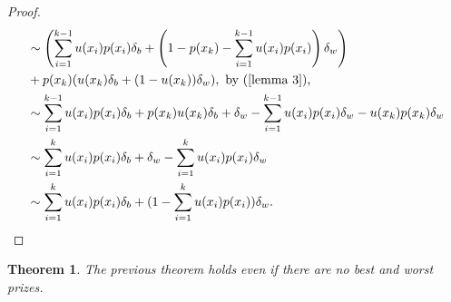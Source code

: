 \documentclass[12pt]{article}
\newtheorem{thm}{Theorem}[section]
\theoremstyle{definition}
\theoremstyle{remark}
\begin{document}
\begin{proof}
\begin{align*}
    &\sim \left(\sum_{i = 1}^{k - 1}u(x_i)p(x_i)\delta_b + \left(1 - p(x_k) - \sum_{i = 1}^{k - 1}u(x_i)p(x_i)\right)\delta_w\right) \\ &+  p(x_k)(u(x_k)\delta_b + (1 - u(x_k))\delta_w), \text{ by (\ref{lemma 3}),} \\
    &\sim \sum_{i = 1}^{k - 1}u(x_i)p(x_i)\delta_b + p(x_k)u(x_k)\delta_b + \delta_w - \sum_{i = 1}^{k - 1}u(x_i)p(x_i)\delta_w - u(x_k)p(x_k)\delta_w \\
    &\sim \sum_{i = 1}^{k}u(x_i)p(x_i)\delta_b + \delta_w - \sum_{i = 1}^{k}u(x_i)p(x_i)\delta_w\\
    &\sim \sum_{i = 1}^{k}u(x_i)p(x_i)\delta_b + (1 - \sum_{i = 1}^{k}u(x_i)p(x_i))\delta_w.
  \end{align*}
\end{proof}
%
%
\begin{thm}
  The previous theorem holds even if there are no best and worst prizes.
\end{thm}
\end{document}
